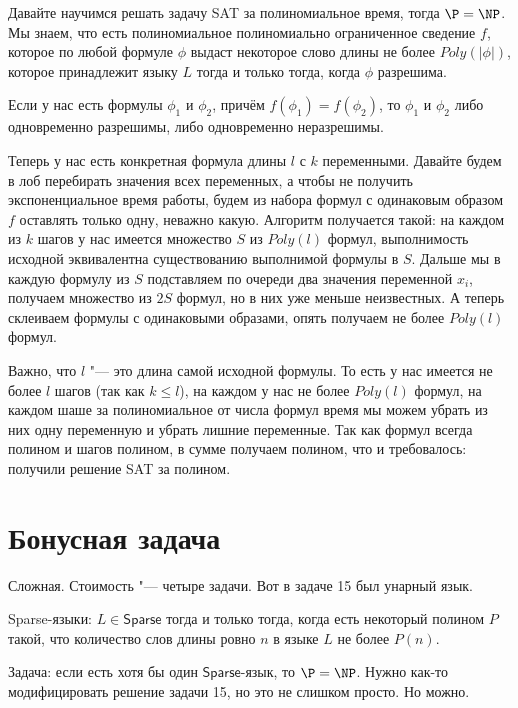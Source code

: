 	Давайте научимся решать задачу SAT за полиномиальное время, тогда $\P=\NP$.
	Мы знаем, что есть полиномиальное полиномиально ограниченное сведение $f$,
	которое по любой формуле $\phi$ выдаст некоторое слово длины не более $Poly(|\phi|)$,
	которое принадлежит языку $L$ тогда и только тогда, когда $\phi$ разрешима.
	\begin{assertion}
		Если у нас есть формулы $\phi_1$ и $\phi_2$, причём $f(\phi_1) = f(\phi_2)$,
		то $\phi_1$ и $\phi_2$ либо одновременно разрешимы, либо одновременно неразрешимы.
	\end{assertion}
	Теперь у нас есть конкретная формула длины $l$ с $k$ переменными.
	Давайте будем в лоб перебирать значения всех переменных, а чтобы не получить экспоненциальное
	время работы, будем из набора формул с одинаковым образом $f$ оставлять только одну, неважно какую.
	Алгоритм получается такой: на каждом из $k$ шагов у нас имеется множество $S$ из $Poly(l)$
	формул, выполнимость исходной эквивалентна существованию выполнимой формулы в $S$.
	Дальше мы в каждую формулу из $S$ подставляем по очереди два значения переменной $x_i$,
	получаем множество из $2S$ формул, но в них уже меньше неизвестных.
	А теперь склеиваем формулы с одинаковыми образами, опять получаем не более $Poly(l)$ формул.

	Важно, что $l$ "--- это длина самой исходной формулы.
	То есть у нас имеется не более $l$ шагов (так как $k \le l$), на каждом у нас не более
	$Poly(l)$ формул, на каждом шаше за полиномиальное от числа формул время мы можем убрать из
	них одну переменную и убрать лишние переменные.
	Так как формул всегда полином и шагов полином, в сумме получаем полином, что и требовалось:
	получили решение SAT за полином.

\section{Бонусная задача}
	Сложная. Стоимость "--- четыре задачи.
	Вот в задаче 15 был унарный язык.
	\begin{Def}
		Sparse-языки: $L \in \mathsf{Sparse}$ тогда и только тогда, когда есть некоторый
		полином $P$ такой, что количество слов длины ровно $n$ в языке $L$ не более
		$P(n)$.
	\end{Def}
	Задача: если есть хотя бы один $\mathsf{Sparse}$-язык, то $\P=\NP$.
	Нужно как-то модифицировать решение задачи 15, но это не слишком просто.
	Но можно.
